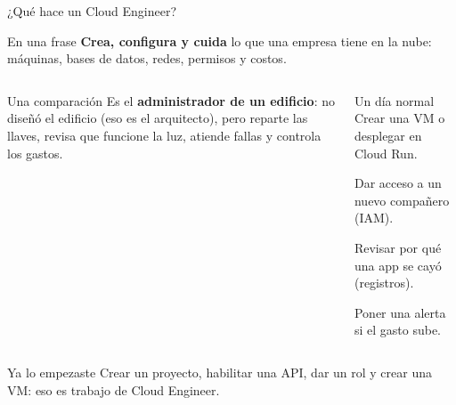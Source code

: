 \documentclass[aspectratio=169,10pt,c]{beamer}
\begin{document}
\begin{frame}{¿Qué hace un Cloud Engineer?}
\begin{block}{En una frase}
\small \textbf{Crea, configura y cuida} lo que una empresa tiene en la nube: máquinas, bases de datos, redes, permisos y costos.
\end{block}
\begin{columns}[T,onlytextwidth]
\begin{exampleblock}{Una comparación}
\small Es el \textbf{administrador de un edificio}: no diseñó el edificio (eso es el arquitecto), pero reparte las llaves, revisa que funcione la luz, atiende fallas y controla los gastos.
\end{exampleblock}
\begin{block}{Un día normal}
\small
Crear una VM o desplegar en Cloud Run.\par\smallskip
Dar acceso a un nuevo compañero (IAM).\par\smallskip
Revisar por qué una app se cayó (registros).\par\smallskip
Poner una alerta si el gasto sube.
\end{block}
\end{columns}
\par\vspace{1mm}
\begin{alertblock}{Ya lo empezaste}
\small Crear un proyecto, habilitar una API, dar un rol y crear una VM: eso es trabajo de Cloud Engineer.
\end{alertblock}
\end{frame}
\end{document}
